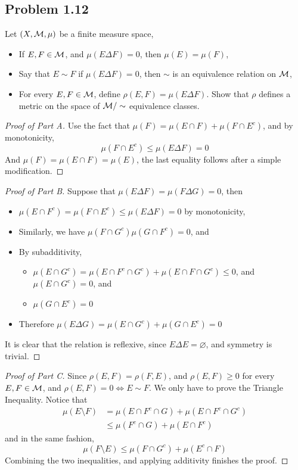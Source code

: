 \documentclass[../../main.tex]{subfiles}
\begin{document}
\subsection*{Problem 1.12}
\begin{wts}
Let $(X,\mathcal{M},\mu)$ be a finite measure space,
\begin{itemize}
    \item If $E,F\in\mathcal{M}$, and $\mu(E\Delta F)=0$, then $\mu(E)=\mu(F)$,
    \item Say that $E\sim F$ if $\mu(E\Delta F)=0$, then $\sim$ is an equivalence relation on $\mathcal{M}$,
    \item For every $E,F\in\mathcal{M}$, define $\rho(E,F)=\mu(E\Delta F)$. Show that $\rho$ defines a metric on the space of $\mathcal{M}/\sim$ equivalence classes.
\end{itemize}
\end{wts}
\begin{proof}[Proof of Part A]
    Use the fact that $\mu(F)=\mu(E\cap F)+\mu(F\cap E^c)$, and by monotonicity,
    \[
    \mu(F\cap E^c)\leq \mu(E\Delta F)=0
    \]
    And $\mu(F)=\mu(E\cap F)=\mu(E)$, the last equality follows after a simple modification.
\end{proof}
\begin{proof}[Proof of Part B]
    Suppose that $\mu(E\Delta F)=\mu(F\Delta G)=0$, then
    \begin{itemize}
        \item $\mu(E\cap F^c)=\mu(F\cap E^c)\leq \mu(E\Delta F)=0$ by monotonicity,
        \item Similarly, we have $\mu(F\cap G^c)\mu(G\cap F^c)=0$, and
        \item By subadditivity, 
        \begin{itemize}
            \item $\mu(E\cap G^c)=\mu(E\cap F^c\cap G^c) + \mu(E\cap F\cap G^c)\leq 0$, and $\mu(E\cap G^c)=0$, and
            \item $\mu(G\cap E^c)=0$
        \end{itemize}
        \item Therefore $\mu(E\Delta G)=\mu(E\cap G^c) + \mu(G\cap E^c)=0$
    \end{itemize}
    It is clear that the relation is reflexive, since $E\Delta E =\varnothing$, and symmetry is trivial.
\end{proof}
\begin{proof}[Proof of Part C]
    Since $\rho(E,F)=\rho(F,E)$, and $\rho(E,F)\geq 0$ for every $E,F\in\mathcal{M}$, and $\rho(E,F)=0\iff E\sim F$. We only have to prove the Triangle Inequality. Notice that
    \begin{align*}
    \mu(E\setminus F) &= \mu(E\cap F^c\cap G) + \mu(E\cap F^c\cap G^c)\\
    &\leq \mu(F^c\cap G) + \mu(E\cap F^c)
    \end{align*}
    and in the same fashion,
    \[
    \mu(F\setminus E) \leq \mu(F\cap G^c) + \mu(E^c\cap F)
    \]
    Combining the two inequalities, and applying additivity finishes the proof.
\end{proof}
\end{document}
